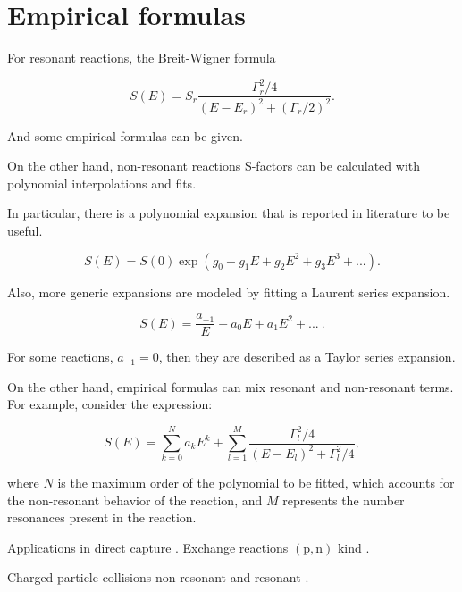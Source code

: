 \documentclass[openany]{book}
\begin{document}
\section{Empirical formulas} \label{sec:empiricalFormulas}


For resonant reactions, the Breit-Wigner formula

\begin{equation}
	S(E) = S_r \frac{\Gamma^2_r/4}{(E-E_r)^2 + (\Gamma_r/2)^2}.
\end{equation}

And some empirical formulas can be given. 

On the other hand, non-resonant reactions S-factors can be calculated with polynomial interpolations and fits. 

In particular, there is a polynomial expansion that is reported in literature to be useful. 


\begin{equation}
	S(E) = S(0)\exp{(g_0 + g_1E + g_2E^2 + g_3E^3 + ...)}.
\end{equation}

Also, more generic expansions are modeled by fitting a Laurent series expansion. 

\begin{equation}
	S(E) =\frac{ a_{-1}}{E} + a_0 E + a_1 E^2 + ... \ .
\end{equation}

For some reactions, $a_{-1} = 0$, then they are described as a Taylor series expansion.

On the other hand, empirical formulas can mix resonant and non-resonant terms. For example, consider the expression: 

\begin{equation}
	S(E) =  \sum _{k = 0}^{N} {a_kE^k} + \sum_{l = 1}^{M} {\frac{\Gamma_l^2/4}{(E - E_l)^2 + \Gamma_l^2/4}},
\end{equation}

where $N$ is the maximum order of the polynomial to be fitted, which accounts for the non-resonant behavior of the reaction, and $M$ represents the number resonances present in the reaction. 

Applications in direct capture \cite{jennings_karataglidis_shoppa_1998}.  Exchange reactions $\mathrm{(p, n)}$ kind \cite{hussein_abdullah_2020}.

Charged particle collisions non-resonant \cite{ueda_sargeant_pato_hussein_2002} and resonant \cite{ueda_sargeant_pato_hussein_2004}. \\
\end{document}
